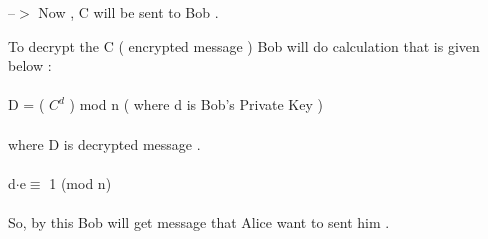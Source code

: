 \documentclass{article}
\begin{document}
    --\(>\) Now , C will be sent to Bob .
    
    \pagebreak
    

    \begin{tcolorbox}
    
    To decrypt the C ( encrypted message ) Bob will do calculation that is given below :\\\\

                                  D = ( \(C^d\) ) mod n      \hspace{1cm} ( where d is Bob's Private Key )\\\\
where D is decrypted message .\\\\

      d$\cdot $e$ \equiv $ 1\hspace{0.25cm} (mod n) \\\\

So, by this Bob will get message that Alice want to sent him .\\

  \end{tcolorbox}
\end{document}
